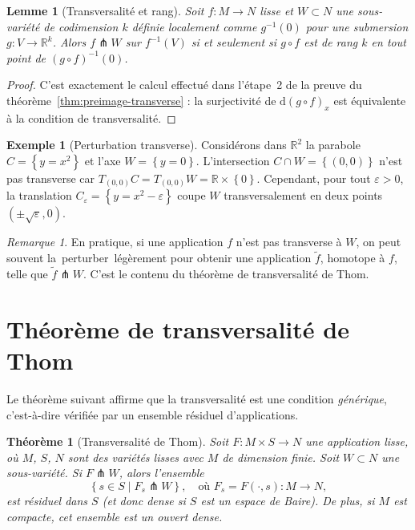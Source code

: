 \documentclass[12pt,a4paper,openany]{book}
\theoremstyle{definition}
\newtheorem{exemple}[definition]{Exemple}
\theoremstyle{plain}
\newtheorem{theoreme}[definition]{Théorème}
\newtheorem{lemme}[definition]{Lemme}
\theoremstyle{remark}
\newtheorem{remarque}[definition]{Remarque}
\newcommand{\R}{\mathbb{R}}
\newcommand{\dd}{\mathrm{d}}
\newcommand{\set}[1]{\left\{#1\right\}}
\providecommand{\og}{\guillemotleft\,}
\providecommand{\fg}{\,\guillemotright}
\begin{document}
\begin{lemme}[Transversalité et rang]\label{lem:transversalite-rang}
Soit $f \colon M \to N$ lisse et $W \subset N$ une sous-variété de
codimension $k$ définie localement comme $g^{-1}(0)$ pour une submersion
$g \colon V \to \R^k$. Alors $f \pitchfork W$ sur $f^{-1}(V)$ si et
seulement si $g \circ f$ est de rang $k$ en tout point de
$(g \circ f)^{-1}(0)$.
\end{lemme}

\begin{proof}
C'est exactement le calcul effectué dans l'étape~2 de la preuve du
théorème~\ref{thm:preimage-transverse} : la surjectivité de
$\dd(g \circ f)_x$ est équivalente à la condition de transversalité.
\end{proof}

\begin{exemple}[Perturbation transverse]\label{ex:perturbation}
Considérons dans $\R^2$ la parabole $C = \set{y = x^2}$ et l'axe
$W = \set{y = 0}$. L'intersection $C \cap W = \set{(0,0)}$ n'est pas
transverse car $T_{(0,0)} C = T_{(0,0)} W = \R \times \set{0}$. Cependant,
pour tout $\varepsilon > 0$, la translation $C_\varepsilon = \set{y = x^2 - \varepsilon}$
coupe $W$ transversalement en deux points $(\pm\sqrt{\varepsilon}, 0)$.
\end{exemple}

\begin{remarque}\label{rem:perturbation-transverse}
En pratique, si une application $f$ n'est pas transverse à $W$, on peut
souvent la \og{}perturber\fg{} légèrement pour obtenir une application
$\tilde{f}$, homotope à $f$, telle que $\tilde{f} \pitchfork W$.
C'est le contenu du théorème de transversalité de Thom.
\end{remarque}

\section{Théorème de transversalité de Thom}\label{sec:thom-transversalite}

Le théorème suivant affirme que la transversalité est une condition
\emph{générique}, c'est-à-dire vérifiée par un
ensemble résiduel d'applications.

\begin{theoreme}[Transversalité de Thom]\label{thm:thom-transversalite}%
Soit $F \colon M \times S \to N$ une application lisse, où $M$, $S$, $N$
sont des variétés lisses avec $M$ de dimension finie. Soit
$W \subset N$ une sous-variété. Si $F \pitchfork W$, alors l'ensemble
\[
  \set{s \in S \mid F_s \pitchfork W},
  \quad \text{où } F_s = F(\cdot, s) \colon M \to N,
\]
est résiduel dans $S$ (et donc dense si $S$ est un espace de Baire).
De plus, si $M$ est compacte, cet ensemble est un ouvert dense.
\end{theoreme}
\end{document}
